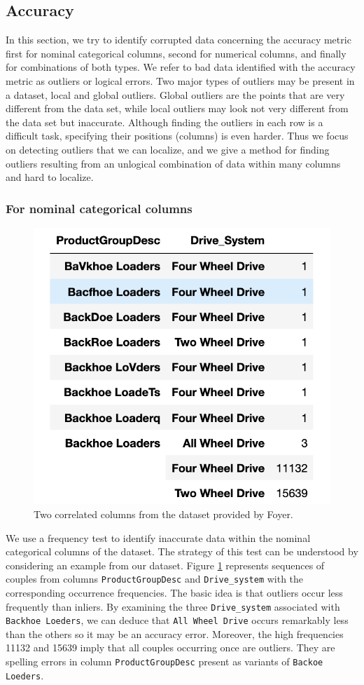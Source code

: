 \documentclass{article}
\begin{document}
\subsection{Accuracy} %
\label{sub:Accuracy}
In this section, we try to identify corrupted data concerning the accuracy metric first for nominal categorical columns, second for numerical columns, and finally for combinations of both types.
We refer to bad data identified with the accuracy metric as outliers or logical errors.
Two major types of outliers may be present in a dataset, local and global outliers.
Global outliers are the points that are very different from the data set, while local outliers may look not very different from the data set but inaccurate.
Although finding the outliers in each row is a difficult task, specifying their positions (columns) is even harder.
Thus we focus on detecting outliers that we can localize, and we give a method for finding outliers resulting from an unlogical combination of data within many columns and hard to localize.
\subsubsection{For nominal categorical columns} %
\label{par:frequncy_test}
\begin{figure}[h]
    \centering
    \includegraphics[width=0.4\linewidth]{picture/logic_err.png}
    \caption{Two correlated columns from the dataset provided by Foyer.}
    \label{fig:logic_err}
\end{figure}
We use a frequency test to identify inaccurate data within the nominal categorical columns of the dataset.
The strategy of this test can be understood by considering an example from our dataset.
Figure \ref{fig:logic_err} represents sequences of couples from columns \texttt{ProductGroupDesc} and \texttt{Drive\_system} with the corresponding occurrence frequencies.
The basic idea is that outliers occur less frequently than inliers.
By examining the three \texttt{Drive\_system} associated with \texttt{Backhoe Loeders}, we can deduce that \texttt{All Wheel Drive} occurs remarkably less than the others so it may be an accuracy error.
Moreover, the high frequencies 11132 and 15639 imply that all couples occurring once are outliers.
They are spelling errors in column \texttt{ProductGroupDesc} present as variants of \texttt{Backoe Loeders}.
\end{document}
